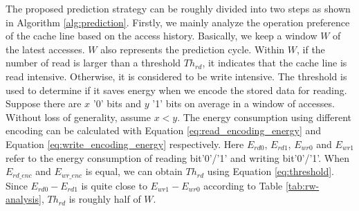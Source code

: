 The proposed prediction strategy can be roughly divided into two steps as 
shown in Algorithm \ref{alg:prediction}. Firstly, we mainly analyze the operation 
preference of the cache line based on the access history. 
Basically, we keep a window $W$ of the latest accesses. 
$W$ also represents the prediction cycle. Within $W$, 
if the number of read is larger than a threshold $Th_{rd}$, 
it indicates that the cache line is read intensive. 
Otherwise, it is considered to be write intensive. 
The threshold is used to determine if it saves energy 
when we encode the stored data for reading. 
Suppose there are $x$ '0' bits and $y$ '1' bits on 
average in a window of accesses. Without loss of generality, assume $x<y$. 
The energy consumption using different encoding can be calculated with 
Equation \ref{eq:read_encoding_energy} and Equation \ref{eq:write_encoding_energy} 
respectively. Here $E_{rd0}$, $E_{rd1}$, $E_{wr0}$ and $E_{wr1}$ refer to 
the energy consumption of reading bit'0'/'1' and writing bit'0'/'1'. When $E_{rd\_enc}$ and $E_{wr\_enc}$ is equal, we can obtain $Th_{rd}$ using Equation \ref{eq:threshold}. 
Since $E_{rd0} - E_{rd1}$ is quite close to $E_{wr1} - E_{wr0}$ 
according to Table \ref{tab:rw-analysis}, $Th_{rd}$ is roughly half of $W$.

